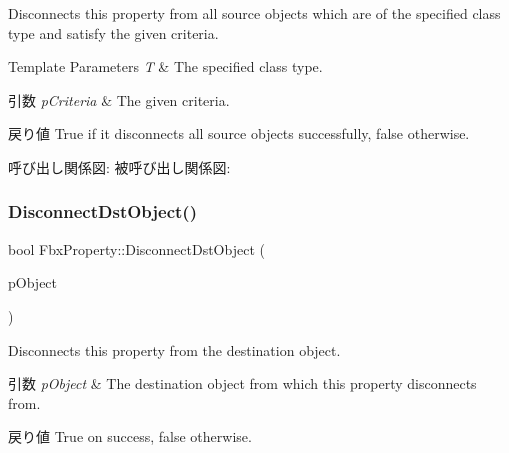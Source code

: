 Disconnects this property from all source objects which are of the specified class type and satisfy the given criteria. 
\begin{DoxyTemplParams}{Template Parameters}
{\em T} & The specified class type. \\
\hline
\end{DoxyTemplParams}

\begin{DoxyParams}{引数}
{\em p\+Criteria} & The given criteria. \\
\hline
\end{DoxyParams}
\begin{DoxyReturn}{戻り値}
{\ttfamily True} if it disconnects all source objects successfully, {\ttfamily false} otherwise. 
\end{DoxyReturn}
呼び出し関係図\+:
被呼び出し関係図\+:
\mbox{\label{class_fbx_property_a322bdde93bd6716cdeeddd29d735d900}} 
\subsubsection{\texorpdfstring{Disconnect\+Dst\+Object()}{DisconnectDstObject()}}
{\footnotesize\ttfamily bool Fbx\+Property\+::\+Disconnect\+Dst\+Object (\begin{DoxyParamCaption}\item[{\hyperlink{class_fbx_object}{Fbx\+Object} $\ast$}]{p\+Object }\end{DoxyParamCaption})}

Disconnects this property from the destination object. 
\begin{DoxyParams}{引数}
{\em p\+Object} & The destination object from which this property disconnects from. \\
\hline
\end{DoxyParams}
\begin{DoxyReturn}{戻り値}
{\ttfamily True} on success, {\ttfamily false} otherwise. 
\end{DoxyReturn}
\mbox{\label{class_fbx_property_aa7178fdcef5b430fd74b5a1385b18ce7}} 
